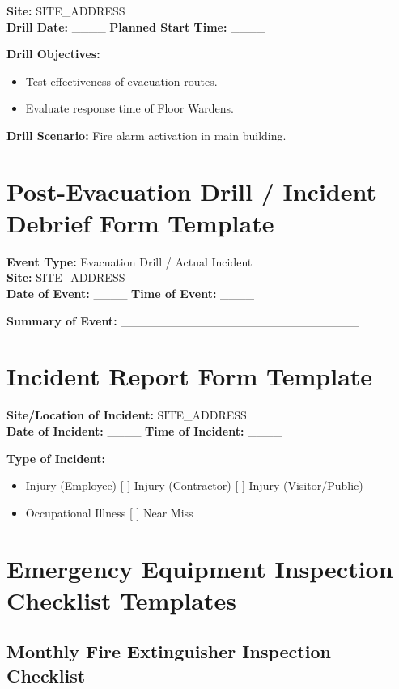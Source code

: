 \documentclass[12pt]{article}
\begin{document}
\textbf{Site:} {{SITE_ADDRESS}}\\
\textbf{Drill Date:} \_\_\_\_ \textbf{Planned Start Time:} \_\_\_\_

\textbf{Drill Objectives:}
\begin{itemize}
    \item Test effectiveness of evacuation routes.
    \item Evaluate response time of Floor Wardens.
\end{itemize}

\textbf{Drill Scenario:} Fire alarm activation in main building.

\section{Post-Evacuation Drill / Incident Debrief Form Template}

\textbf{Event Type:} Evacuation Drill / Actual Incident\\
\textbf{Site:} {{SITE_ADDRESS}}\\
\textbf{Date of Event:} \_\_\_\_ \textbf{Time of Event:} \_\_\_\_

\textbf{Summary of Event:}
\_\_\_\_\_\_\_\_\_\_\_\_\_\_\_\_\_\_\_\_\_\_\_\_\_\_\_\_

\section{Incident Report Form Template}

\textbf{Site/Location of Incident:} {{SITE_ADDRESS}}\\
\textbf{Date of Incident:} \_\_\_\_ \textbf{Time of Incident:} \_\_\_\_

\textbf{Type of Incident:}
\begin{itemize}
    \item [ ] Injury (Employee) [ ] Injury (Contractor) [ ] Injury (Visitor/Public)
    \item [ ] Occupational Illness [ ] Near Miss
\end{itemize}

\section{Emergency Equipment Inspection Checklist Templates}

\subsection{Monthly Fire Extinguisher Inspection Checklist}
\end{document}
